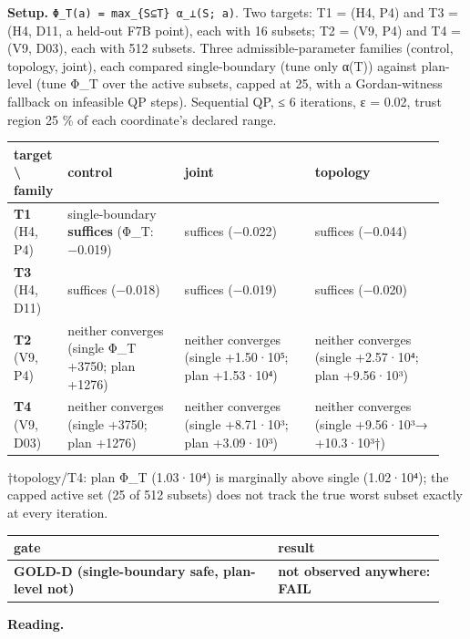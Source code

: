 \documentclass[10pt,a4paper]{article}
\begin{document}
\textbf{Setup.} \texttt{Φ\_\allowbreak{}T(a) =\allowbreak{} max\_\allowbreak{}\{S⊆T\} α\_\allowbreak{}⊥(S; a)}. Two targets: T1 = (H4, P4) and T3 = (H4, D11, a held-out F7B point), each with 16 subsets; T2 = (V9, P4) and T4 = (V9, D03), each with 512 subsets. Three admissible-parameter families (control, topology, joint), each compared single-boundary (tune only α(T)) against plan-level (tune Φ\_T over the active subsets, capped at 25, with a Gordan-witness fallback on infeasible QP steps). Sequential QP, ≤ 6 iterations, ε = 0.02, trust region 25 \% of each coordinate's declared range.

{\small
\begin{longtable}{L{0.090\linewidth}L{0.269\linewidth}L{0.291\linewidth}L{0.291\linewidth}}
\toprule
\textbf{target \textbackslash{} family} & \textbf{control} & \textbf{joint} & \textbf{topology} \\
\midrule
\endhead
\textbf{T1} (H4, P4) & single-boundary \textbf{suffices} (Φ\_T: −0.019) & suffices (−0.022) & suffices (−0.044) \\
\textbf{T3} (H4, D11) & suffices (−0.018) & suffices (−0.019) & suffices (−0.020) \\
\textbf{T2} (V9, P4) & neither converges (single Φ\_T +3750; plan +1276) & neither converges (single +1.50·10⁵; plan +1.53·10⁴) & neither converges (single +2.57·10⁴; plan +9.56·10³) \\
\textbf{T4} (V9, D03) & neither converges (single +3750; plan +1276) & neither converges (single +8.71·10³; plan +3.09·10³) & neither converges (single +9.56·10³→ +10.3·10³†) \\
\bottomrule
\end{longtable}}
†topology/T4: plan Φ\_T (1.03·10⁴) is marginally above single (1.02·10⁴); the capped active set (25 of 512 subsets) does not track the true worst subset exactly at every iteration.

{\small
\begin{longtable}{L{0.576\linewidth}L{0.364\linewidth}}
\toprule
\textbf{gate} & \textbf{result} \\
\midrule
\endhead
\textbf{GOLD-D (single-boundary safe, plan-level not)} & \textbf{not observed anywhere: FAIL} \\
\bottomrule
\end{longtable}}
\textbf{Reading.}
\end{document}
